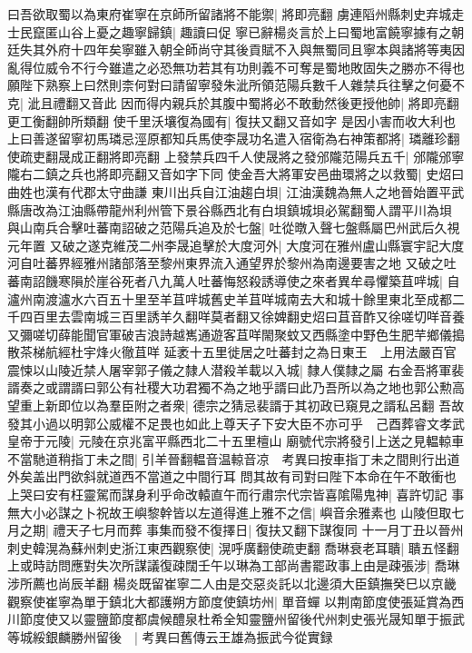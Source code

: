 曰吾欲取蜀以為東府崔寧在京師所留諸將不能禦|{
	將即亮翻}
虜連䧟州縣刺史弃城走士民竄匿山谷上憂之趣寧歸鎮|{
	趣讀曰促}
寧已辭楊炎言於上曰蜀地富饒寧據有之朝廷失其外府十四年矣寧雖入朝全師尚守其後貢賦不入與無蜀同且寧本與諸將等夷因亂得位威令不行今雖遣之必恐無功若其有功則義不可奪是蜀地敗固失之勝亦不得也願陛下熟察上曰然則柰何對曰請留寧發朱泚所領范陽兵數千人雜禁兵往擊之何憂不克|{
	泚且禮翻又音此}
因而得内親兵於其腹中蜀將必不敢動然後更授他帥|{
	將即亮翻更工衡翻帥所類翻}
使千里沃壤復為國有|{
	復扶又翻又音如字}
是因小害而收大利也上曰善遂留寧初馬璘忌涇原都知兵馬使李晟功名遣入宿衛為右神策都將|{
	璘離珍翻使疏吏翻晟成正翻將即亮翻}
上發禁兵四千人使晟將之發邠隴范陽兵五千|{
	邠隴邠寧隴右二鎮之兵也將即亮翻又音如字下同}
使金吾大將軍安邑曲環將之以救蜀|{
	史炤曰曲姓也漢有代郡太守曲謙}
東川出兵自江油趨白垻|{
	江油漢魏為無人之地晉始置平武縣唐改為江油縣帶龍州利州管下景谷縣西北有白垻鎮城垻必駕翻蜀人謂平川為垻}
與山南兵合擊吐蕃南詔破之范陽兵追及於七盤|{
	吐從暾入聲七盤縣屬巴州武后久視元年置}
又破之遂克維茂二州李晟追擊於大度河外|{
	大度河在雅州盧山縣寰宇記大度河自吐蕃界經雅州諸部落至黎州東界流入通望界於黎州為南邊要害之地}
又破之吐蕃南詔饑寒隕於崖谷死者八九萬人吐蕃悔怒殺誘導使之來者異牟尋懼築苴哶城|{
	自瀘州南渡瀘水六百五十里至羊苴哶城舊史羊苴咩城南去大和城十餘里東北至成都二千四百里去雲南城三百里誘羊久翻咩莫者翻又徐婢翻史炤曰苴音酢又徐嗟切咩音養又彌嗟切薛能聞官軍破吉浪詩越嶲通遊客苴咩閙聚蚊又西縣塗中野色生肥芉鄉儀搗散茶梯航經杜宇烽火徹苴咩}
延袤十五里徙居之吐蕃封之為日東王　上用法嚴百官震悚以山陵近禁人屠宰郭子儀之隸人潜殺羊載以入城|{
	隸人僕隸之屬}
右金吾將軍裴諝奏之或謂諝曰郭公有社稷大功君獨不為之地乎諝曰此乃吾所以為之地也郭公勲高望重上新即位以為羣臣附之者衆|{
	德宗之猜忌裴諝于其初政已窺見之諝私呂翻}
吾故發其小過以明郭公威權不足畏也如此上尊天子下安大臣不亦可乎　己酉葬睿文孝武皇帝于元陵|{
	元陵在京兆富平縣西北二十五里檀山}
廟號代宗將發引上送之見輼輬車不當馳道稍指丁未之間|{
	引羊晉翻輼音温輬音凉　考異曰按車指丁未之間則行出道外矣盖出門欲斜就道西不當道之中間行耳}
問其故有司對曰陛下本命在午不敢衝也上哭曰安有枉靈駕而謀身利乎命改轅直午而行肅宗代宗皆喜隂陽鬼神|{
	喜許切記}
事無大小必謀之卜祝故王嶼黎幹皆以左道得進上雅不之信|{
	嶼音余雅素也}
山陵但取七月之期|{
	禮天子七月而葬}
事集而發不復擇日|{
	復扶又翻下謀復同}
十一月丁丑以晉州刺史韓滉為蘇州刺史浙江東西觀察使|{
	滉呼廣翻使疏吏翻}
喬琳衰老耳聵|{
	聵五怪翻}
上或時訪問應對失次所謀議復疎闊壬午以琳為工部尚書罷政事上由是疎張涉|{
	喬琳涉所薦也尚辰羊翻}
楊炎既留崔寧二人由是交惡炎託以北邊須大臣鎮撫癸巳以京畿觀察使崔寧為單于鎮北大都護朔方節度使鎮坊州|{
	單音蟬}
以荆南節度使張延賞為西川節度使又以靈鹽節度都虞候醴泉杜希全知靈鹽州留後代州刺史張光晟知單于振武等城綏銀麟勝州留後　|{
	考異曰舊傳云王雄為振武今從實録}
